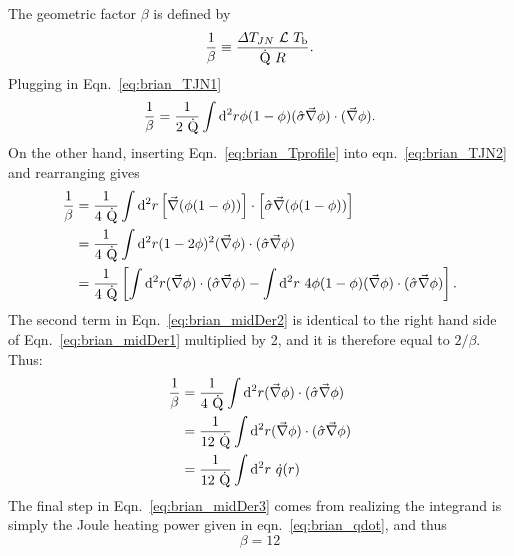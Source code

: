 The geometric factor $\beta$ is defined by
\begin{equation}
\frac{1}{\beta}\equiv\frac{\Delta T_{JN}~\mathcal{L}~T_\mathrm{b}}{\dot{\mathrm{Q}}~R}.
\end{equation}
Plugging in Eqn.~\ref{eq:brian_TJN1}
\begin{equation}
\frac{1}{\beta} = \frac{1}{2~\dot{\mathrm{Q}}}\int\mathrm{d}^2r\phi(1-\phi)(\hat\sigma\vec\nabla\phi)\cdot(\vec\nabla\phi).
\label{eq:brian_midDer1}
\end{equation}
On the other hand, inserting Eqn.~\ref{eq:brian_Tprofile} into eqn.~\ref{eq:brian_TJN2} and rearranging gives
\begin{align}
\frac{1}{\beta} &= \frac{1}{4~\dot{\mathrm{Q}}}\int\mathrm{d}^2r\left[\vec\nabla(\phi(1-\phi))\right]\cdot\left[\hat\sigma\vec\nabla(\phi(1-\phi))\right] \nonumber \\
&=\frac{1}{4~\dot{\mathrm{Q}}}\int\mathrm{d}^2r(1-2\phi)^2(\vec\nabla\phi)\cdot(\hat\sigma\vec\nabla\phi) \nonumber \\
&=\frac{1}{4~\dot{\mathrm{Q}}}\left[\int\mathrm{d}^2r(\vec\nabla\phi)\cdot(\hat\sigma\vec\nabla\phi) - \int\mathrm{d}^2r~4\phi(1-\phi)(\vec\nabla\phi)\cdot(\hat\sigma\vec\nabla\phi)\right].\label{eq:brian_midDer2}
\end{align}
The second term in Eqn.~\ref{eq:brian_midDer2} is identical to the right hand side of Eqn.~\ref{eq:brian_midDer1} multiplied by 2, and it is therefore equal to $2/\beta$. Thus:
\begin{align}
\frac{1}{\beta} &= \frac{1}{4~\dot{\mathrm{Q}}}\int\mathrm{d}^2r(\vec\nabla\phi)\cdot(\hat\sigma\vec\nabla\phi) \nonumber \\
&=\frac{1}{12~\dot{\mathrm{Q}}}\int\mathrm{d}^2r(\vec\nabla\phi)\cdot(\hat\sigma\vec\nabla\phi) \nonumber \\
&=\frac{1}{12~\dot{\mathrm{Q}}}\int\mathrm{d}^2r~\dot{q}(r)\label{eq:brian_midDer3}
\end{align}
The final step in Eqn.~\ref{eq:brian_midDer3} comes from realizing the integrand is simply the Joule heating power given in eqn.~\ref{eq:brian_qdot}, and thus
\begin{equation}
\beta = 12
\end{equation}

